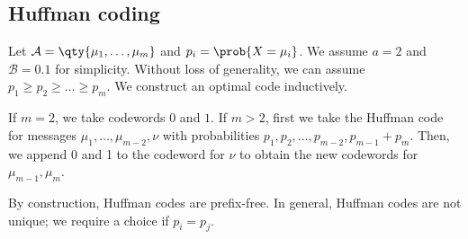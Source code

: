 \subsection{Huffman coding}
Let $\mathcal A = \qty{\mu_1, \dots, \mu_m}$ and $p_i = \prob{X = \mu_i}$.
We assume $a = 2$ and $\mathcal B = \qty{0,1}$ for simplicity.
Without loss of generality, we can assume $p_1 \geq p_2 \geq \dots \geq p_m$.
We construct an optimal code inductively.

If $m = 2$, we take codewords $0$ and $1$.
If $m > 2$, first we take the Huffman code for messages $\mu_1, \dots, \mu_{m-2}, \nu$ with probabilities $p_1, p_2, \dots, p_{m-2}, p_{m-1} + p_m$.
Then, we append 0 and 1 to the codeword for $\nu$ to obtain the new codewords for $\mu_{m-1}, \mu_m$.
\begin{remark}
    By construction, Huffman codes are prefix-free.
    In general, Huffman codes are not unique; we require a choice if $p_i = p_j$.
\end{remark}

